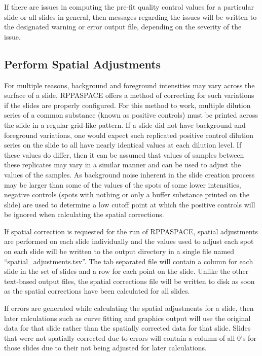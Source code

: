 \documentclass[
]{article}
\begin{document}
If there are issues in computing the pre-fit quality control values for
a particular slide or all slides in general, then messages regarding the
issues will be written to the designated warning or error output file,
depending on the severity of the issue.

\hypertarget{process_3}{%
\subsection{Perform Spatial Adjustments}\label{process_3}}

For multiple reasons, background and foreground intensities may vary
across the surface of a slide. RPPASPACE offers a method of correcting
for such variations if the slides are properly configured. For this
method to work, multiple dilution series of a common substance (known as
positive controls) must be printed across the slide in a regular
grid-like pattern. If a slide did not have background and foreground
variations, one would expect such replicated positive control dilution
series on the slide to all have nearly identical values at each dilution
level. If these values do differ, then it can be assumed that values of
samples between these replicates may vary in a similar manner and can be
used to adjust the values of the samples. As background noise inherent
in the slide creation process may be larger than some of the values of
the spots of some lower intensities, negative controls (spots with
nothing or only a buffer substance printed on the slide) are used to
determine a low cutoff point at which the positive controls will be
ignored when calculating the spatial corrections.

If spatial correction is requested for the run of RPPASPACE, spatial
adjustments are performed on each slide individually and the values used
to adjust each spot on each slide will be written to the output
directory in a single file named ``spatial\_adjustments.tsv''. The tab
separated file will contain a column for each slide in the set of slides
and a row for each point on the slide. Unlike the other text-based
output files, the spatial corrections file will be written to disk as
soon as the spatial corrections have been calculated for all slides.

If errors are generated while calculating the spatial adjustments for a
slide, then later calculations such as curve fitting and graphics output
will use the original data for that slide rather than the spatially
corrected data for that slide. Slides that were not spatially corrected
due to errors will contain a column of all 0's for those slides due to
their not being adjusted for later calculations.
\end{document}
